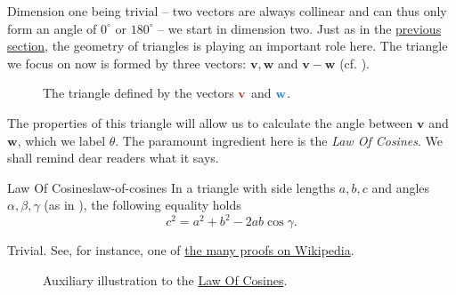 Dimension one being trivial -- two vectors are always collinear and can thus
only form an angle of $0^{ \circ }$ or $180^{ \circ }$ -- we start in dimension
two. Just as in the \hyperref[sec:length-of-a-vector]{previous section}, the
geometry of triangles is playing an important role here. The triangle we focus
on now is formed by three vectors: $\mathbf{v}, \mathbf{w}$ and $\mathbf{v} -
\mathbf{w}$ (cf. ).
\begin{figure}[ht]
 \centering

 \caption{The triangle defined by the vectors $\clr{\mathbf{v}}$ and
 $\clb{\mathbf{w}}$.}
 \label{fig:vectors-triangle}
\end{figure}

The properties of this triangle will allow us to calculate the angle between
$\mathbf{v}$ and $\mathbf{w}$, which we label $\theta$. The paramount ingredient
here is the \emph{Law Of Cosines}. We shall remind dear readers what it says.

\begin{theorem}{Law Of Cosines}{law-of-cosines}
 In a triangle with side lengths $a,b,c$ and angles $\alpha,\beta,\gamma$ (as in
 ), the following equality holds
 \[
  c^2 = a^2 + b^2 - 2ab \cos\gamma.
 \]
\end{theorem}
\begin{thmproof}
 Trivial. See, for instance, one of
 \href{https://en.wikipedia.org/wiki/Law_of_cosines#Proofs}{the many proofs on
 Wikipedia}.
\end{thmproof}

\begin{figure}[ht]
 \centering

 \caption{Auxiliary illustration to the \hyperref[thm:law-of-cosines]{Law Of
 Cosines}.}
 \label{fig:law-of-cosines}
\end{figure}

